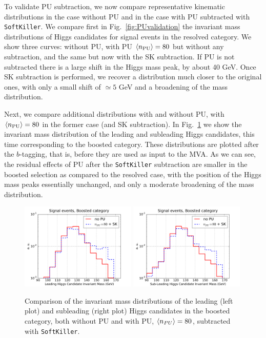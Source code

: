 To validate PU subtraction,
we now compare representative kinematic distributions
in the case without PU and in the case
with PU subtracted with {\tt SoftKiller}.
%
We compare first
in Fig.~\ref{fig:PUvalidation} the
invariant mass distributions of Higgs candidates for signal
events in the resolved category.
%
We show three curves: without PU,
with PU $\left\langle n_{\rm PU}\right\rangle=80$ but without any subtraction, and the
same but now with the SK subtraction.
%
If PU is not subtracted there is a large shift in the Higgs mass
peak, by about 40 GeV.
%
Once SK subtraction is performed, we recover a distribution much closer
to the original ones, with only a small shift of $\simeq 5$ GeV
and a broadening of the mass
distribution.
%


Next, we compare additional
 distributions with
and without PU, with $\left\langle n_{\rm PU}\right\rangle=80$ in the
former
case (and SK subtraction).
%
In Fig.~\ref{fig:m_H_PU} we show the invariant mass distribution
of the leading and subleading Higgs candidates,
this time corresponding
to the boosted category.
%
These distributions are plotted after the $b$-tagging, that is,
before they are used as input to the MVA.
%
As we can see, the residual effects of PU
after the {\tt SoftKiller} subtraction are smaller
in the boosted selection as compared to the resolved case,
with the position of the Higgs mass peaks essentially
unchanged, and only a moderate broadening of the
mass distribution.
%

\begin{figure}[t]
  \begin{center}
      \includegraphics[width=0.49\textwidth]{plots/m_H0_bst_comp.pdf}
      \includegraphics[width=0.49\textwidth]{plots/m_H1_bst_comp.pdf}
  \caption{\small
    Comparison of the invariant mass distributions of the leading (left plot)
    and subleading (right plot) Higgs candidates
    in the boosted category,
    both without PU and with
    PU, $\left\langle n_{PU}\right\rangle=80$, subtracted with {\tt SoftKiller}.
}
\label{fig:m_H_PU}
\end{center}
\end{figure}

